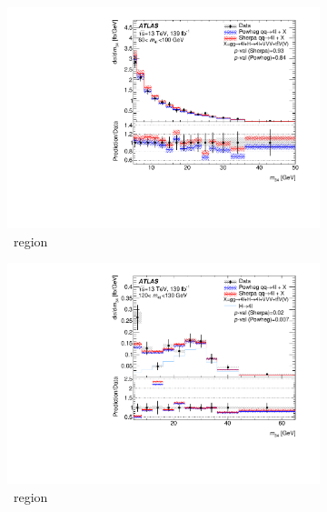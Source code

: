 \begin{figure}[H]
    \begin{subfigure}{.49\textwidth}\centering
      \includegraphics[width=.95\linewidth]{Figures/m4l/UnfoldedResults/linY_Unfolded_Data_m34_m4l60-100.pdf}\caption{\ZFourL \ region}\label{fig:sub-first}
    \end{subfigure}
    \begin{subfigure}{.49\textwidth}\centering
      \includegraphics[width=.95\linewidth]{Figures/m4l/UnfoldedResults/higgs_linY_Unfolded_Data_m34_m4l120-130.pdf} \caption{\HFourL \ region}\label{fig:sub-second}
    \end{subfigure}
    \begin{subfigure}{.49\textwidth}\centering

\end{subfigure}
\end{figure}
